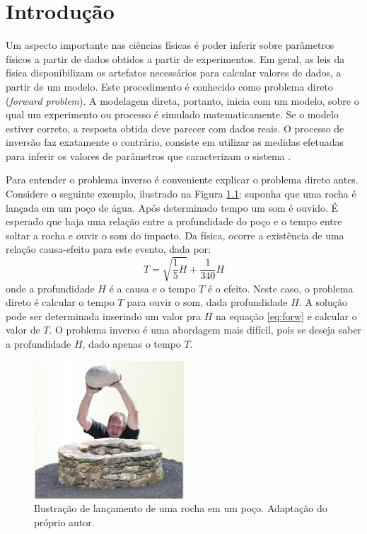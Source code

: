 \chapter{Introdução}
\label{cap:1intro}
% 
Um aspecto importante nas ciências físicas é poder inferir sobre parâmetros
físicos a partir de dados obtidos a partir de experimentos. Em geral, as leis da física disponibilizam os
artefatos necessários para calcular valores de dados, a partir de um modelo.
Este procedimento é conhecido como problema direto (\textit{forward problem}).
A modelagem direta, portanto, inicia com um modelo, sobre o qual um experimento ou processo
é simulado matematicamente. Se o modelo estiver correto, a resposta
obtida deve parecer com dados reais. O processo de inversão faz exatamente o contrário,
consiste em utilizar as medidas efetuadas para inferir os valores de parâmetros que
caracterizam o sistema \citep{tarantola}.

Para entender o problema inverso é conveniente explicar o problema direto antes.
Considere o seguinte exemplo, ilustrado na Figura \ref{fig:LanRoc}: suponha que uma rocha é lançada em um poço de água.
Após determinado tempo um som é ouvido. É esperado que haja uma relação entre a
profundidade do poço e o tempo entre soltar a rocha e ouvir o som do impacto. Da física,
ocorre a existência de uma relação causa-efeito para este evento, dada por:
\begin{equation}
\label{eq:forw}
T = \sqrt{\frac{1}{5}H} + \frac{1}{340}H
\end{equation}
onde a profundidade $H$ é a causa e o tempo $T$ é o efeito.
Neste caso, o problema direto é calcular o tempo $T$ para ouvir o som, dada profundidade $H$.
A solução pode ser determinada inserindo um valor pra $H$ na equação \ref{eq:forw} e calcular o
valor de $T$. O problema inverso é uma abordagem mais difícil, pois se deseja
saber a profundidade $H$, dado apenas o tempo $T$.

\begin{figure}[htp]
\begin{center}
  \includegraphics[width=0.5\textwidth]{fig/LancamentoRocha}
  \caption{Ilustração de lançamento de uma rocha em um poço. Adaptação do próprio autor.}
  \label{fig:LanRoc}
\end{center}
\end{figure}

